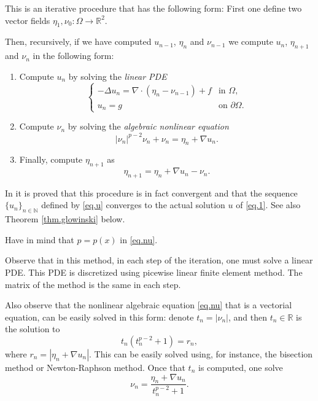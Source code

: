 \documentclass[11pt]{amsart}
\newcommand{\R}{\mathbb R}
\newcommand{\N}{\mathbb{N}}
\theoremstyle{remark}
\theoremstyle{definition}
\numberwithin{equation}{section}
\begin{document}
This is an iterative procedure that has the following form: First one define two vector fields $\eta_1, \nu_0\colon \Omega\to \R^2$.

Then, recursively, if we have computed $u_{n-1}$, $\eta_n$ and $\nu_{n-1}$ we compute  $u_n$, $\eta_{n+1}$ and $\nu_n$ in the following form:
\begin{enumerate}
\item Compute $u_n$ by solving the {\em linear PDE}
\begin{equation}\label{eq.u}
\begin{cases}
-\Delta u_n  = \nabla\cdot(\eta _n - \nu_{n-1}) + f & \text{in }\Omega,\\
u_n=g & \text{on }\partial\Omega.
\end{cases}
\end{equation}

\item Compute $\nu_n$ by solving the {\em algebraic nonlinear equation}
\begin{equation}\label{eq.nu}
|\nu_n|^{p-2}\nu_n + \nu_n = \eta_n + \nabla u_n.
\end{equation}

\item Finally, compute $\eta_{n+1}$ as
\begin{equation}\label{eq.eta}
\eta_{n+1} = \eta_n + \nabla u_n - \nu_n.
\end{equation}
\end{enumerate}

In \cite{DPM} it is proved that this procedure is in fact convergent and that the sequence $\{u_n\}_{n\in\N}$ defined by \eqref{eq.u} converges to the actual solution $u$ of \eqref{eq.1}. See also Theorem \ref{thm.glowinski} below.

Have in mind that $p=p(x)$ in \eqref{eq.nu}.

Observe that in this method, in each step of the iteration, one must solve a linear PDE. This PDE is discretized using picewise linear finite element method. The matrix of the method is the same in each step.


Also observe that the nonlinear algebraic equation \eqref{eq.nu} that is a vectorial equation, can be easily solved in this form: denote $t_n=|\nu_n|$, and then $t_n \in\R$ is the solution to
$$
t_n(t_n^{p-2}+1) = r_n,
$$
where $r_n=|\eta_n + \nabla u_n|$. This can be easily solved using, for instance, the bisection method or Newton-Raphson method. Once that $t_n$ is computed, one solve
$$
\nu_n = \frac{\eta_n + \nabla u_n}{t_n^{p-2}+1}.
$$
\end{document}
